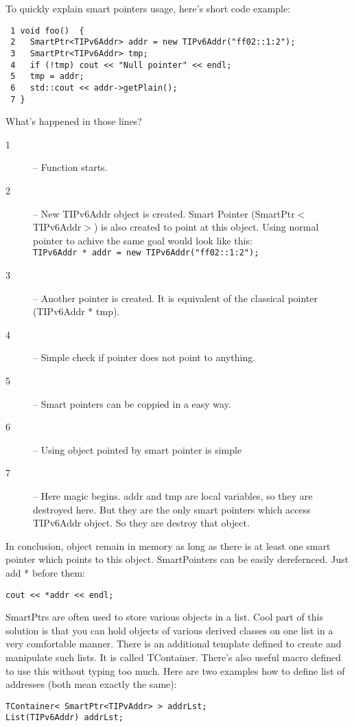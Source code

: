 To quickly explain smart pointers usage, here's short code example:
\begin{verbatim}
 1 void foo()  {
 2   SmartPtr<TIPv6Addr> addr = new TIPv6Addr("ff02::1:2");
 3   SmartPtr<TIPv6Addr> tmp;
 4   if (!tmp) cout << "Null pointer" << endl;
 5   tmp = addr;
 6   std::cout << addr->getPlain();
 7 }
\end{verbatim}
What's happened in those lines?
\begin{description}
\item[1] -- Function starts.
\item[2] -- New TIPv6Addr object is created. Smart Pointer
  (SmartPtr$<$TIPv6Addr$>$) is also created to point at this object. Using
  normal pointer to achive the same goal would look like this: \\
  \verb+TIPv6Addr * addr = new TIPv6Addr("ff02::1:2");+
\item[3] -- Another pointer is created. It is equivalent of the
  classical pointer (TIPv6Addr * tmp).
\item[4] -- Simple check if pointer does not point to anything.
\item[5] -- Smart pointers can be coppied in a easy way.
\item[6] -- Using object pointed by smart pointer is simple
\item[7] -- Here magic begins. addr and tmp are local variables, so
  they are destroyed here. But they are the only smart pointers which
  access TIPv6Addr object. So they are destroy that object. 
\end{description}

In conclusion, object remain in memory as long as there is at least
one smart pointer which points to this object. SmartPointers can be
easily derefernced. Just add * before them:
\begin{verbatim}
cout << *addr << endl;
\end{verbatim}

SmartPtrs are often used to store various objects in a list. Cool part
of this solution is that you can hold objects of various derived
classes on one list in a very comfortable manner. There is an
additional template defined to create and manipulate such lists. It is
called TContainer. There's also useful macro defined to use this
without typing too much. Here are two examples how to define list of
addresses (both mean exactly the same):
\begin{verbatim}
TContainer< SmartPtr<TIPvAddr> > addrLst;
List(TIPv6Addr) addrLst;
\end{verbatim}

